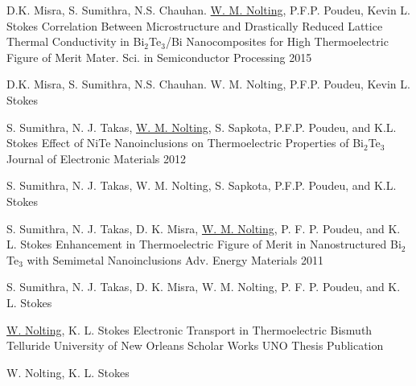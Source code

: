 \begin{cventries}
\cventrywrite
{D.K. Misra, S. Sumithra, N.S. Chauhan. \underline{W. M. Nolting}, P.F.P. Poudeu, Kevin L. Stokes} %
{Correlation Between Microstructure and Drastically Reduced Lattice Thermal Conductivity in Bi$_2$Te$_3$/Bi Nanocomposites for High Thermoelectric Figure of Merit} %
{Mater. Sci. in Semiconductor Processing} %
{2015} %
{
  \begin{cvitems} %
    \item {D.K. Misra, S. Sumithra, N.S. Chauhan. W. M. Nolting, P.F.P. Poudeu, Kevin L. Stokes}
  \end{cvitems}
}

\cventrywrite
{S. Sumithra, N. J. Takas, \underline{W. M. Nolting}, S. Sapkota, P.F.P. Poudeu, and K.L. Stokes} %
{Effect of NiTe Nanoinclusions on Thermoelectric Properties of Bi$_2$Te$_3$} %
{Journal of Electronic Materials} %
{2012} %
{
  \begin{cvitems} %
    \item {S. Sumithra, N. J. Takas, W. M. Nolting, S. Sapkota, P.F.P. Poudeu, and K.L. Stokes}
  \end{cvitems}
}

\cventrywrite
{S. Sumithra, N. J. Takas, D. K. Misra, \underline{W. M. Nolting}, P. F. P. Poudeu, and K. L. Stokes} %
{Enhancement in Thermoelectric Figure of Merit in Nanostructured Bi$_2$Te$_3$ with Semimetal Nanoinclusions} %
{Adv. Energy Materials} %
{2011} %
{
  \begin{cvitems} %
    \item {S. Sumithra, N. J. Takas, D. K. Misra, W. M. Nolting, P. F. P. Poudeu, and K. L. Stokes}
  \end{cvitems}
}

\cventrywrite
{\underline{W. Nolting}, K. L. Stokes} %
{Electronic Transport in Thermoelectric Bismuth Telluride} %
{University of New Orleans} %
{Scholar Works UNO Thesis Publication} %
{
  \begin{cvitems} %
    \item {W. Nolting, K. L. Stokes}
  \end{cvitems}
}

\end{cventries}

